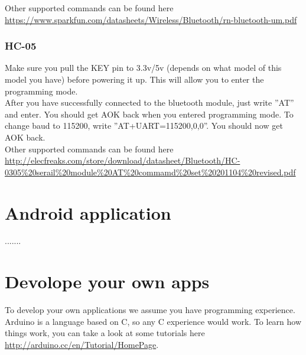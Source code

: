 				Other supported commands can be found here \url{https://www.sparkfun.com/datasheets/Wireless/Bluetooth/rn-bluetooth-um.pdf}

				\subsubsection{HC-05}
				Make sure you pull the KEY pin to 3.3v/5v (depends on what model of this model you have) before powering it up. This will allow you to enter the programming mode.\\
				
				After you have successfully connected to the bluetooth module, just write ''AT'' and enter. You should get AOK back when you entered programming mode. To change baud to 115200, write ''AT+UART=115200,0,0''. You should now get AOK back.\\
				
				Other supported commands can be found here \url{http://elecfreaks.com/store/download/datasheet/Bluetooth/HC-0305%20serail%20module%20AT%20commamd%20set%20201104%20revised.pdf}
				
	\section{Android application}\label{sec:install-android-application}
	.......
	
	\section{Devolope your own apps}
	To develop your own applications we assume you have programming experience. Arduino is a language based on C, so any C experience would work. To learn how things work, you can take a look at some tutorials here \url{http://arduino.cc/en/Tutorial/HomePage}.\\